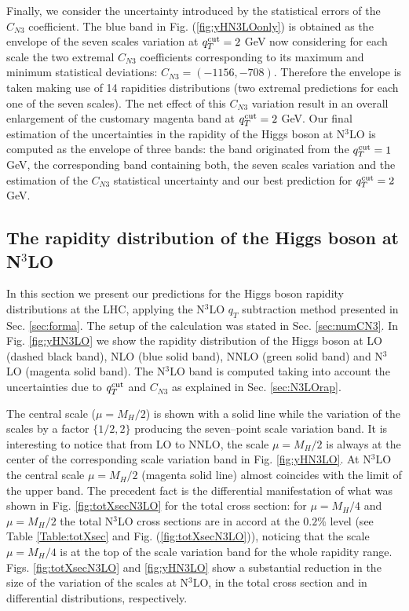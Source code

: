 \documentclass[12pt]{article}
\def\qt{q_T}
\begin{document}
Finally, we consider the uncertainty introduced by the statistical errors of the $C_{N3}$ coefficient. The blue band in Fig. (\ref{fig:yHN3LOonly}) is obtained as the envelope of the seven scales variation at $q_{T}^{\rm cut}=2$ GeV now considering for each scale the two extremal $C_{N3}$ coefficients corresponding to its maximum and minimum statistical deviations: $C_{N3} =(-1156,-708)$. Therefore the envelope is taken making use of 14 rapidities distributions (two extremal predictions for each one of the seven scales). The net effect of this $C_{N3}$ variation result in an overall enlargement of the customary magenta band at $q_{T}^{\rm cut}=2$ GeV. Our final estimation of the uncertainties in the rapidity of the Higgs boson at N$^{3}$LO is computed as the envelope of three bands: the band originated from the $q_{T}^{\rm cut}=1$ GeV,  the corresponding band containing both, the seven scales variation and the estimation of the $C_{N3}$ statistical uncertainty and our best prediction for $q_{T}^{\rm cut}=2$ GeV.

\subsection{The rapidity distribution of the Higgs boson at N$^{3}$LO}
\label{sec:results}

In this section we present our predictions for the Higgs boson rapidity distributions at the LHC, applying the N$^{3}$LO $\qt$ subtraction method presented in Sec.  \ref{sec:forma}. The setup of the calculation was stated in Sec. \ref{sec:numCN3}. In Fig. \ref{fig:yHN3LO} we show the rapidity distribution of the Higgs boson at LO (dashed black band), NLO (blue solid band), NNLO (green solid band) and N$^{3}$LO (magenta solid band). The N$^{3}$LO band is computed taking into account the uncertainties due to $q_{T}^{\rm cut}$ and $C_{N3}$  as explained in Sec. \ref{sec:N3LOrap}.

The central scale ($\mu=M_{H}/2$) is shown with a solid line while the variation of the scales by a factor $\{1/2,2\}$ producing the seven--point scale variation band. It is interesting to notice that from LO to NNLO, the scale $\mu=M_{H}/2$ is always at the center of the corresponding scale variation band in Fig. \ref{fig:yHN3LO}.  At N$^{3}$LO the central scale $\mu=M_{H}/2$ (magenta solid line) almost coincides with the limit of the upper band. The precedent fact is the differential manifestation of what was shown in Fig. \ref{fig:totXsecN3LO} for the total cross section:  for $\mu=M_{H}/4$ and $\mu=M_{H}/2$ the total N$^{3}$LO cross sections are in accord at the $0.2\%$ level (see Table \ref{Table:totXsec} and Fig. (\ref{fig:totXsecN3LO})), noticing that the scale $\mu=M_{H}/4$ is at the top of the scale variation band for the whole rapidity range. Figs. \ref{fig:totXsecN3LO} and \ref{fig:yHN3LO} show a substantial reduction in the size of the variation of the scales at N$^{3}$LO, in the total cross section and in differential distributions, respectively.  
\end{document}
